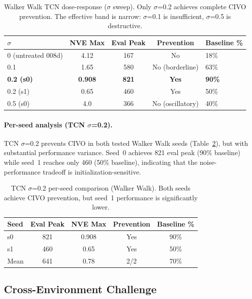 \documentclass{article}
\begin{document}
\begin{table}[h]
\centering
\caption{Walker Walk TCN dose-response ($\sigma$ sweep). Only $\sigma$=0.2 achieves complete CIVO prevention.
The effective band is narrow: $\sigma$=0.1 is insufficient, $\sigma$=0.5 is destructive.}
\label{tab:tcn-walker-dose}
\begin{tabular}{lcccl}
\toprule
\textbf{$\sigma$} & \textbf{NVE Max} & \textbf{Eval Peak} & \textbf{Prevention} & \textbf{Baseline \%} \\
\midrule
0 (untreated 008d) & 4.12 & 167 & No & 18\% \\
0.1 & 1.65 & 580 & No (borderline) & 63\% \\
\textbf{0.2 (s0)} & \textbf{0.908} & \textbf{821} & \textbf{Yes} & \textbf{90\%} \\
0.2 (s1) & 0.65 & 460 & Yes & 50\% \\
0.5 (s0) & 4.0 & 366 & No (oscillatory) & 40\% \\
\bottomrule
\end{tabular}
\end{table}

\paragraph{Per-seed analysis (TCN $\sigma$=0.2).}
TCN $\sigma$=0.2 prevents CIVO in both tested Walker Walk seeds (Table~\ref{tab:tcn-walker-seeds}), but with substantial performance variance.
Seed~0 achieves 821 eval peak (90\% baseline) while seed~1 reaches only 460 (50\% baseline), indicating that the noise-performance tradeoff is initialization-sensitive.

\begin{table}[h]
\centering
\caption{TCN $\sigma$=0.2 per-seed comparison (Walker Walk). Both seeds achieve CIVO prevention, but seed~1 performance is significantly lower.}
\label{tab:tcn-walker-seeds}
\begin{tabular}{lcccc}
\toprule
\textbf{Seed} & \textbf{Eval Peak} & \textbf{NVE Max} & \textbf{Prevention} & \textbf{Baseline \%} \\
\midrule
s0 & 821 & 0.908 & Yes & 90\% \\
s1 & 460 & 0.65 & Yes & 50\% \\
\midrule
Mean & 641 & 0.78 & 2/2 & 70\% \\
\bottomrule
\end{tabular}
\end{table}

\subsection{Cross-Environment Challenge}
\end{document}
